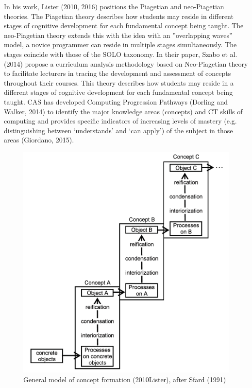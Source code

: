 In his work, Lister (2010, 2016) positions the Piagetian and neo-Piagetian theories. The Piagetian theory describes how students may reside in different stages of cognitive development for each fundamental concept being taught. The neo-Piagetian theory extends this with the idea with an ”overlapping waves” model, a novice programmer can reside in multiple stages simultaneously. The stages coincide with those of the SOLO taxonomy. In their paper, Szabo et al. (2014) propose a curriculum analysis methodology based on Neo-Piagetian theory to facilitate lecturers in tracing the development and assessment of concepts throughout their courses. This theory describes how students may reside in a different stages of cognitive development for each fundamental concept being taught. CAS has developed Computing Progression Pathways (Dorling and Walker, 2014) to identify the major knowledge areas (concepts) and CT skills of computing and provides specific indicators of increasing levels of mastery (e.g. distinguishing between ‘understands’ and ‘can apply’) of the subject in those areas (Giordano, 2015). 

\begin{figure}
\includegraphics[scale=0.8]{figures/ListerFases.png}
\caption{General model of concept formation (2010Lister), after Sfard (1991)}\label{fig:ListerFases}
\end{figure}

